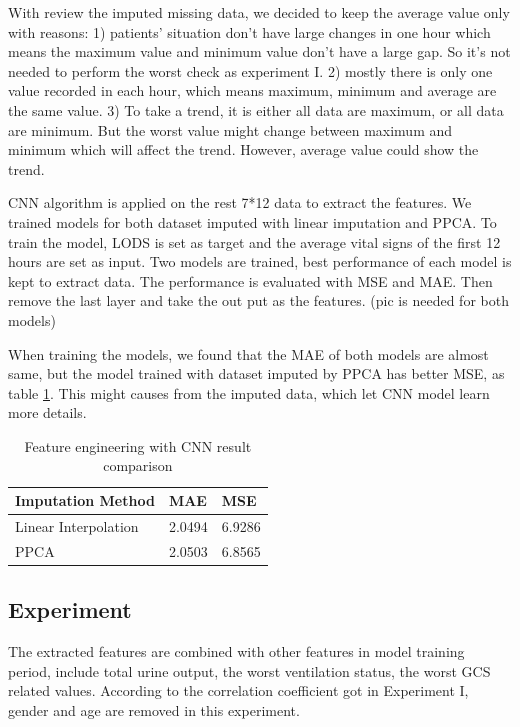 \documentclass[12pt,a4paper,english
]{tunithesis}
\begin{document}
With review the imputed missing data, we decided to keep the average value only with reasons: 1) patients' situation don't have large changes in one hour which means the maximum value and minimum value don't have a large gap. So it's not needed to perform the worst check as experiment I. 2) mostly there is only one value recorded in each hour, which means maximum, minimum and average are the same value. 3) To take a trend, it is either all data are maximum, or all data are minimum. But the worst value might change between maximum and minimum which will affect the trend. However, average value could show the trend. 

CNN algorithm is applied on the rest 7*12 data to extract the features. We trained models for both dataset imputed with linear imputation and PPCA. To train the model, LODS is set as target and the average vital signs of the first 12 hours are set as input. Two models are trained, best performance of each model is kept to extract data. The performance is evaluated with MSE and MAE. Then remove the last layer and take the out put as the features. (pic is needed for both models)

When training the models, we found that the MAE of both models are almost same, but the model trained with dataset imputed by PPCA has better MSE, as table \ref{table:cnn_result_comparison}. This might causes from the imputed data, which let CNN model learn more details.

\begin{table}[]
\centering
    \caption{Feature engineering with CNN result comparison}
    \label{table:cnn_result_comparison}
    \begin{tabular}{|l|l|l|}
        \hline
        \textbf{Imputation Method} & \textbf{MAE} & \textbf{MSE} \\ \hline
        Linear Interpolation & 2.0494 & 6.9286 \\ \hline
        PPCA & 2.0503 & 6.8565 \\ \hline
    \end{tabular}
\end{table}

\subsection{Experiment}
The extracted features are combined with other features in model training period, include total urine output, the worst ventilation status, the worst GCS related values. According to the correlation coefficient got in Experiment I, gender and age are removed in this experiment. 
\end{document}

